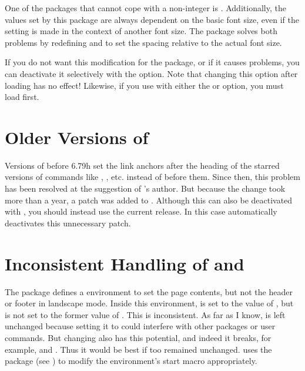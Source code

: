 One of the packages that cannot cope with
a non-integer  is
. Additionally, the values
set by this package are always dependent on the basic font size, even if the
setting is made in the context of another font size. The 
package solves both problems by redefining  and
 to set the spacing relative to the actual font size.

If you do not want this modification for the package, or if it causes
problems, you can deactivate it selectively with the
option. Note that changing this option after loading
 has no effect! Likewise, if you use  with
either the  or  option, you must
load  first.


\section{Older Versions of }

Versions of  before 6.79h set the link
anchors after the heading of the starred versions of commands like
, , etc. instead of
before them. Since then, this problem has been resolved at the suggestion of
\KOMAScript{}'s author. But because the change took more than a year, a patch
was added to . Although this can also be deactivated with
, you should instead use the current
 release. In this case  automatically
deactivates this unnecessary patch.%


\section{Inconsistent Handling of  and }

The
 package defines a
 environment to set the page
contents, but not the header or footer in landscape mode. Inside this
environment,  is set to the value
of , but  is not set to the former value
of . This is inconsistent. As far as I know,
 is left unchanged because setting it to 
could interfere with other packages or user commands. But changing
 also has this potential, and indeed it breaks, for
example,  and
. Thus it would be best if
 too remained unchanged.  uses the
 package (see \cite{package:xpatch}) to modify the
 environment's start macro appropriately.

